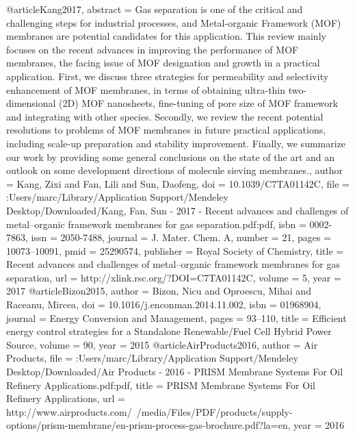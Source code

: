 @article{Kang2017,
abstract = {Gas separation is one of the critical and challenging steps for industrial processes, and Metal-organic Framework (MOF) membranes are potential candidates for this application. This review mainly focuses on the recent advances in improving the performance of MOF membranes, the facing issue of MOF designation and growth in a practical application. First, we discuss three strategies for permeability and selectivity enhancement of MOF membranes, in terms of obtaining ultra-thin two-dimensional (2D) MOF nanosheets, fine-tuning of pore size of MOF framework and integrating with other species. Secondly, we review the recent potential resolutions to problems of MOF membranes in future practical applications, including scale-up preparation and stability improvement. Finally, we summarize our work by providing some general conclusions on the state of the art and an outlook on some development directions of molecule sieving membranes.},
author = {Kang, Zixi and Fan, Lili and Sun, Daofeng},
doi = {10.1039/C7TA01142C},
file = {:Users/marc/Library/Application Support/Mendeley Desktop/Downloaded/Kang, Fan, Sun - 2017 - Recent advances and challenges of metal–organic framework membranes for gas separation.pdf:pdf},
isbn = {0002-7863},
issn = {2050-7488},
journal = {J. Mater. Chem. A},
number = {21},
pages = {10073--10091},
pmid = {25290574},
publisher = {Royal Society of Chemistry},
title = {{Recent advances and challenges of metal–organic framework membranes for gas separation}},
url = {http://xlink.rsc.org/?DOI=C7TA01142C},
volume = {5},
year = {2017}
}
@article{Bizon2015,
author = {Bizon, Nicu and Oproescu, Mihai and Raceanu, Mircea},
doi = {10.1016/j.enconman.2014.11.002},
isbn = {01968904},
journal = {Energy Conversion and Management},
pages = {93--110},
title = {{Efficient energy control strategies for a Standalone Renewable/Fuel Cell Hybrid Power Source}},
volume = {90},
year = {2015}
}
@article{AirProducts2016,
author = {{Air Products}},
file = {:Users/marc/Library/Application Support/Mendeley Desktop/Downloaded/Air Products - 2016 - PRISM{\textregistered} Membrane Systems For Oil Refinery Applications.pdf:pdf},
title = {{PRISM{\textregistered} Membrane Systems For Oil Refinery Applications}},
url = {http://www.airproducts.com/{~}/media/Files/PDF/products/supply-options/prism-membrane/en-prism-process-gas-brochure.pdf?la=en},
year = {2016}
}
